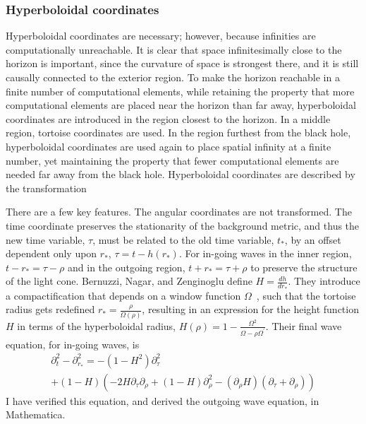 \subsubsection{Hyperboloidal coordinates}  
Hyperboloidal coordinates are necessary; however, because infinities are computationally unreachable. It is clear that space infinitesimally close to the horizon is important, since the curvature of space is strongest there, and it is still causally connected to the exterior region. To make the horizon reachable in a finite number of computational elements, while retaining the property that more computational elements are placed near the horizon than far away, hyperboloidal coordinates are introduced in the region closest to the horizon. In a middle region, tortoise coordinates are used. In the region furthest from the black hole, hyperboloidal coordinates are used again to place spatial infinity at a finite number, yet maintaining the property that fewer computational elements are needed far away from the black hole. Hyperboloidal coordinates are described by the transformation~\cite{hyperboloidalCoordinates}

There are a few key features. The angular coordinates are not transformed. The time coordinate preserves the stationarity of the background metric, and thus the new time variable, $\tau$, must be related to the old time variable, $t_*$, by an offset dependent only upon $r_*$, $\tau=t-h(r_*)$. For in-going waves in the inner region, $t-r_*=\tau-\rho$ and in the outgoing region, $t+r_*=\tau+\rho$ to preserve the structure of the light cone. Bernuzzi, Nagar, and Zenginoglu define $H=\frac{dh}{dr_*}$. They introduce a compactification that depends on a window function $\Omega$~\cite{OmegaTransferFunction}, such that the tortoise radius gets redefined  $r_*=\frac{\rho}{\Omega(\rho)}$, resulting in an expression for the height function $H$ in terms of the hyperboloidal radius,  $H(\rho)=1-\frac{\Omega^2}{\Omega-\rho\Omega^\prime}$. Their final wave equation, for in-going waves, is~\cite{hyperboloidalCoordinates}
  \begin{eqnarray}
    \partial_t^2-\partial_{r_*}^2=-(1-H^2)\partial_\tau^2\nonumber\\
    +(1-H)(-2H\partial_\tau\partial_\rho+(1-H)\partial_\rho^2-(\partial_\rho H)(\partial_\tau+\partial_\rho))
  \end{eqnarray}    
I have verified this equation, and derived the outgoing wave equation, in Mathematica.

  



